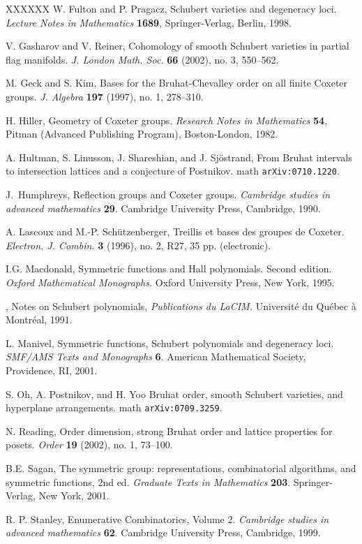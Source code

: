 \documentclass[12pt,dvips]{amsart}
\theoremstyle{plain}
\theoremstyle{definition}
\theoremstyle{remark}
\numberwithin{equation}{section}
\begin{document}
\begin{thebibliography}{XXXXXX}
W. Fulton and P. Pragacz, 
Schubert varieties and degeneracy loci.
{\it Lecture Notes in Mathematics} {\bf 1689},
Springer-Verlag, Berlin, 1998. 

V. Gasharov and V. Reiner,
Cohomology of smooth Schubert varieties in partial flag manifolds. 
{\it J. London Math. Soc.} {\bf 66} (2002), no. 3, 550--562. 

M. Geck and S. Kim, 
Bases for the Bruhat-Chevalley order on all finite Coxeter groups.  
{\it J. Algebra}  {\bf 197}  (1997),  no. 1, 278--310. 

H. Hiller,
Geometry of Coxeter groups.
{\it Research Notes in Mathematics} {\bf 54},
Pitman (Advanced Publishing Program), Boston-London, 1982.


A. Hultman, S. Linusson, J. Shareshian, and J. Sj\"ostrand,
From Bruhat intervals to intersection lattices and a conjecture of Postnikov.
math {\tt arXiv:0710.1220}.

J.~Humphreys, Reflection groups and Coxeter groups. 
{\it Cambridge studies
in advanced mathematics} {\bf 29}. Cambridge University Press, Cambridge, 1990.

A. Lascoux and M.-P. Sch\"utzenberger,
Treillis et bases des groupes de Coxeter. 
{\it Electron. J. Combin.} {\bf 3} (1996), no. 2, R27, 35 pp. (electronic).

I.G. Macdonald, 
Symmetric functions and Hall polynomials. Second edition. 
{\it Oxford Mathematical Monographs.}
Oxford University Press, New York, 1995.

\bysame, 
Notes on Schubert polynomials, {\it Publications du LaCIM.}
Universit\'e du Qu\'ebec \`a Montr\'eal, 1991.


L. Manivel, 
Symmetric functions, Schubert polynomials and degeneracy loci. 
{\it SMF/AMS Texts and Monographs} {\bf 6}.
American Mathematical Society, Providence, RI, 2001. 

S. Oh, A. Postnikov, and H. Yoo
Bruhat order, smooth Schubert varieties, and hyperplane arrangements.
math {\tt arXiv:0709.3259}.


N. Reading,
Order dimension, strong Bruhat order and lattice properties for posets. 
{\it Order} {\bf 19} (2002), no. 1, 73--100. 

B.E. Sagan, 
The symmetric group: representations, combinatorial algorithms, 
and symmetric functions, 2nd ed. 
{\it Graduate Texts in Mathematics} {\bf 203}. Springer-Verlag, New York, 2001.

R. P. Stanley, Enumerative Combinatorics, Volume 2. 
{\it Cambridge studies
in advanced mathematics} {\bf 62}. Cambridge University Press, Cambridge, 1999.



\end{thebibliography}
\end{document}
